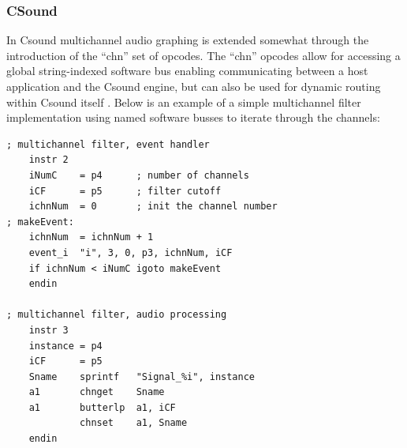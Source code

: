 \documentclass[twoside,a4paper]{article}
\begin{document}


\subsubsection{CSound}

In Csound multichannel audio graphing is extended somewhat through the introduction of the ``chn'' set of opcodes.
The ``chn'' opcodes allow for accessing a global string-indexed software bus enabling communicating between a host application and the Csound engine, but can also be used for dynamic routing within Csound itself \cite{Yi:2006}.
Below is an example of  a simple multichannel filter implementation using named software busses to iterate through the channels:


\begin{lstlisting}
; multichannel filter, event handler 
    instr 2 
    iNumC    = p4      ; number of channels 
    iCF      = p5      ; filter cutoff 
    ichnNum  = 0       ; init the channel number 
; makeEvent:
    ichnNum  = ichnNum + 1
    event_i  "i", 3, 0, p3, ichnNum, iCF
    if ichnNum < iNumC igoto makeEvent
    endin

; multichannel filter, audio processing
    instr 3    
    instance = p4
    iCF      = p5
    Sname    sprintf   "Signal_%i", instance        
    a1       chnget    Sname
    a1       butterlp  a1, iCF
             chnset    a1, Sname
    endin
\end{lstlisting}  
\end{document}
